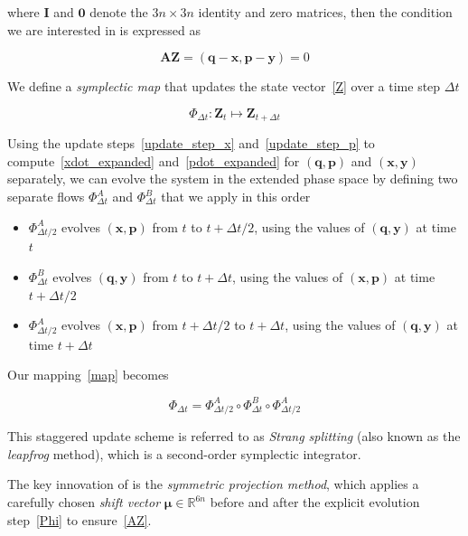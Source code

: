 \documentclass[12pt,a4paper]{article}
\theoremstyle{definition}
\theoremstyle{remark}
\begin{document}
where $\mathbf{I}$ and $\mathbf{0}$ denote the $3n \times 3n$ identity and zero matrices, then the condition we are interested in is expressed as

\begin{equation}\label{AZ}
    \mathbf{A} \mathbf{Z} = (\mathbf{q} - \mathbf{x}, \mathbf{p} - \mathbf{y}) = 0
\end{equation}

We define a \textit{symplectic map} that updates the state vector~\eqref{Z} over a time step $\Delta t$

\begin{equation}\label{map}
    \Phi_{\Delta t}: \mathbf{Z}_t \mapsto \mathbf{Z}_{t+\Delta t}
\end{equation}

Using the update steps~\eqref{update_step_x} and~\eqref{update_step_p} to compute~\eqref{xdot_expanded} and~\eqref{pdot_expanded} for $(\mathbf{q}, \mathbf{p})$ and $(\mathbf{x}, \mathbf{y})$ separately, we can evolve the system in the extended phase space by defining two separate flows $\Phi^A_{\Delta t}$ and $\Phi^B_{\Delta t}$ that we apply in this order

\begin{itemize}
    \item $\Phi^A_{\Delta t / 2}$ evolves $(\mathbf{x}, \mathbf{p})$ from $t$ to $t + \Delta t / 2$, using the values of $(\mathbf{q}, \mathbf{y})$ at time $t$
    \item $\Phi^B_{\Delta t}$ evolves $(\mathbf{q}, \mathbf{y})$ from $t$ to $t + \Delta t$, using the values of $(\mathbf{x}, \mathbf{p})$ at time $t + \Delta t / 2$
    \item $\Phi^A_{\Delta t / 2}$ evolves $(\mathbf{x}, \mathbf{p})$ from $t + \Delta t / 2$ to $t + \Delta t$, using the values of $(\mathbf{q}, \mathbf{y})$ at time $t + \Delta t$
\end{itemize}

Our mapping~\eqref{map} becomes

\begin{equation}\label{Phi}
    \boxed{\Phi_{\Delta t} = \Phi^A_{\Delta t/2} \circ \Phi^B_{\Delta t} \circ \Phi^A_{\Delta t/2}}
\end{equation}

This staggered update scheme is referred to as \textit{Strang splitting} (also known as the \textit{leapfrog} method), which is a second-order symplectic integrator.

The key innovation of \citep{Jayawardana2023} is the \textit{symmetric projection method}, which applies a carefully chosen \textit{shift vector} $\boldsymbol{\mu} \in \mathbb{R}^{6n}$ before and after the explicit evolution step~\eqref{Phi} to ensure~\eqref{AZ}.
\end{document}
